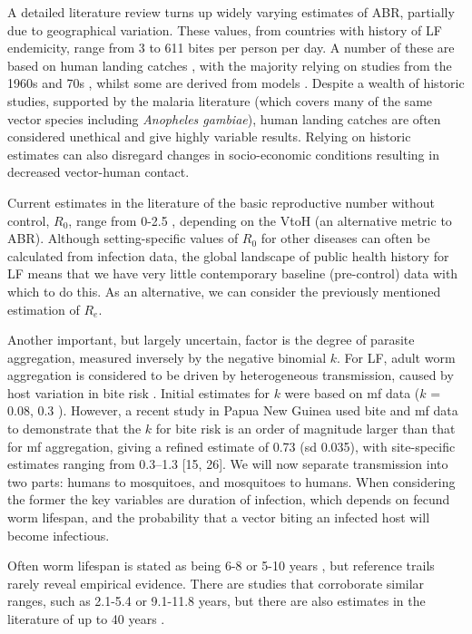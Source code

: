 A detailed literature review turns up widely varying estimates of ABR, partially due to geographical variation. These values, from countries with history of LF endemicity, range from 3 \cite{Killeen2000} to 611 \cite{Michael2016} bites per person per day. A number of these are based on human landing catches \cite{Killeen2000,Michael2016,Braack2015}, with the majority relying on studies from the 1960s and 70s \cite{Michael2016}, whilst some are derived from models \cite{Stolk2005}. Despite a wealth of historic studies, supported by the malaria literature (which covers many of the same vector species including \textit{Anopheles gambiae}), human landing catches are often considered unethical and give highly variable results. Relying on historic estimates can also disregard changes in socio-economic conditions resulting in decreased vector-human contact.

Current estimates in the literature of the basic reproductive number without control, $R_0$, range from 0-2.5 \cite{Stone2014}, depending on the \gls{VtoH} (an alternative metric to ABR). Although setting-specific values of $R_0$ for other diseases can often be calculated from infection data, the global landscape of public health history for LF means that we have very little contemporary baseline (pre-control) data with which to do this. As an alternative, we can consider the previously mentioned estimation of $R_e$.

Another important, but largely uncertain, factor is the degree of parasite aggregation, measured inversely by the negative binomial $k$. For LF, adult worm aggregation is considered to be driven by heterogeneous transmission, caused by host variation in bite risk \cite{Irvine2018}. Initial estimates for $k$ were based on mf data ($k$ = 0.08, 0.3 \cite{irvine2015,Irvine2017_Mosquitobite}). However, a recent study in Papua New Guinea used bite and mf data to demonstrate that the $k$ for bite risk is an order of magnitude larger than that for mf aggregation, giving a refined estimate of 0.73 (\acrshort{sd} 0.035), with site-specific estimates ranging from 0.3--1.3 [15, 26]. We will now separate transmission into two parts: humans to mosquitoes, and mosquitoes to humans. When considering the former the key variables are duration of infection, which depends on fecund worm lifespan, and the probability that a vector biting an infected host will become infectious. 

Often worm lifespan is stated as being 6-8 \cite{WHO2019_FactSheet} or 5-10 years \cite{Norman2000_epifil,Stolk2006}, but reference trails rarely reveal empirical evidence. There are studies that corroborate similar ranges, such as 2.1-5.4 \cite{Vanamail1996} or 9.1-11.8 \cite{Subramanian2004} years, but there are also estimates in the literature of up to 40 years \cite{Carme1979}.

